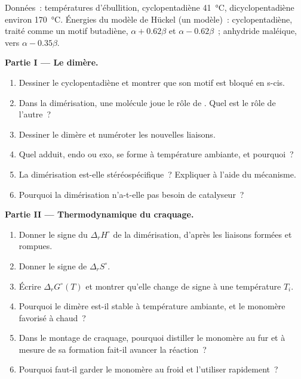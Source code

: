 \begin{problem}
\label{pb:b2:frontier-orbitals:1}
Données~: températures d'ébullition, cyclopentadiène \qty{41}{\degreeCelsius}, dicyclopentadiène environ
\qty{170}{\degreeCelsius}. Énergies du modèle de Hückel (un modèle)~: cyclopentadiène, traité comme
un motif butadiène,  $\alpha + 0.62\beta$ et  $\alpha - 0.62\beta$~; anhydride maléique, 
vers $\alpha - 0.35\beta$.

\medskip
\noindent\textbf{Partie I --- Le dimère.}
\begin{enumerate}
  \item Dessiner le cyclopentadiène et montrer que son motif  est bloqué en s-cis.
  \item Dans la dimérisation, une molécule joue le rôle de . Quel est le rôle de l'autre~?
  \item Dessiner le dimère et numéroter les nouvelles liaisons.
  \item Quel adduit, endo ou exo, se forme à température ambiante, et pourquoi~?
  \item La dimérisation est-elle stéréospécifique~? Expliquer à l'aide du mécanisme.
  \item Pourquoi la dimérisation n'a-t-elle pas besoin de catalyseur~?
\end{enumerate}

\medskip
\noindent\textbf{Partie II --- Thermodynamique du craquage.}
\begin{enumerate}[resume]
  \item Donner le signe du $\Delta_r H^\circ$ de la dimérisation, d'après les liaisons formées et
        rompues.
  \item Donner le signe de $\Delta_r S^\circ$.
  \item Écrire $\Delta_r G^\circ(T)$ et montrer qu'elle change de signe à une température $T_i$.
  \item Pourquoi le dimère est-il stable à température ambiante, et le monomère favorisé à chaud~?
  \item Dans le montage de craquage, pourquoi distiller le monomère au fur et à mesure de sa formation
        fait-il avancer la réaction~?
  \item Pourquoi faut-il garder le monomère au froid et l'utiliser rapidement~?
\end{enumerate}


\end{problem}
